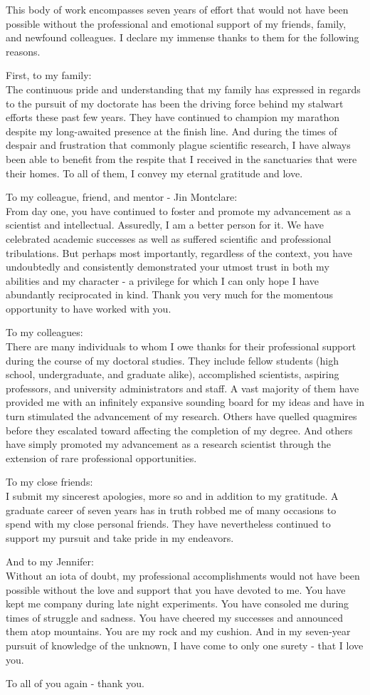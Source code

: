 This body of work encompasses seven years of effort that would not have been
possible without the professional and emotional support of my friends, family,
and newfound colleagues. I declare my immense thanks to them for the
following reasons.

First, to my family:\\
The continuous pride and understanding that my family has expressed in regards
to the pursuit of my doctorate has been the driving force behind my stalwart
efforts these past few years. They have continued to champion my marathon
despite my long-awaited presence at the finish line. And during the times of despair
and frustration that commonly plague scientific research, I have always been
able to benefit from the respite that I received in the sanctuaries that were
their homes. To all of them, I convey my eternal gratitude and love.

To my colleague, friend, and mentor - Jin Montclare:\\
From day one, you have continued to foster and promote my advancement as a
scientist and intellectual. Assuredly, I am a better person for it.  We have
celebrated academic successes as well as suffered scientific and professional
tribulations. But perhaps most importantly, regardless of the context, you have
undoubtedly and consistently demonstrated your utmost trust in both my abilities
and my character - a privilege for which I can only hope I have abundantly
reciprocated in kind. Thank you very much for the momentous opportunity to have
worked with you.

To my colleagues:\\
There are many individuals to whom I owe thanks for their professional support
during the course of my doctoral studies. They include fellow students (high
school, undergraduate, and graduate alike), accomplished scientists, aspiring
professors, and university administrators and staff. A vast majority of them
have provided me with an infinitely expansive sounding board for my ideas and
have in turn stimulated the advancement of my research. Others have quelled
quagmires before they escalated toward affecting the completion of my degree.
And others have simply promoted my advancement as a research scientist through
the extension of rare professional opportunities. 

To my close friends:\\
I submit my sincerest apologies, more so and in addition to my gratitude. A
graduate career of seven years has in truth robbed me of many occasions to spend
with my close personal friends. They have nevertheless continued to support
my pursuit and take pride in my endeavors.

And to my Jennifer:\\
Without an iota of doubt, my professional accomplishments would not
have been possible without the love and support that you have devoted to me. You
have kept me company during late night experiments. You have consoled me during
times of struggle and sadness. You have cheered my successes and announced them
atop mountains. You are my rock and my cushion. And in my seven-year pursuit of
knowledge of the unknown, I have come to only one surety - that I love you.

To all of you again - thank you.
